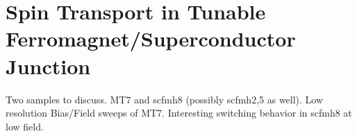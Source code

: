 
\chapter{Spin Transport in Tunable Ferromagnet/Superconductor Junction}
\label{sec:SCFM}

Two samples to discuss. MT7 and scfmh8 (possibly scfmh2,5 as well). Low resolution Bias/Field sweeps of MT7. Interesting switching behavior in scfmh8 at low field.
